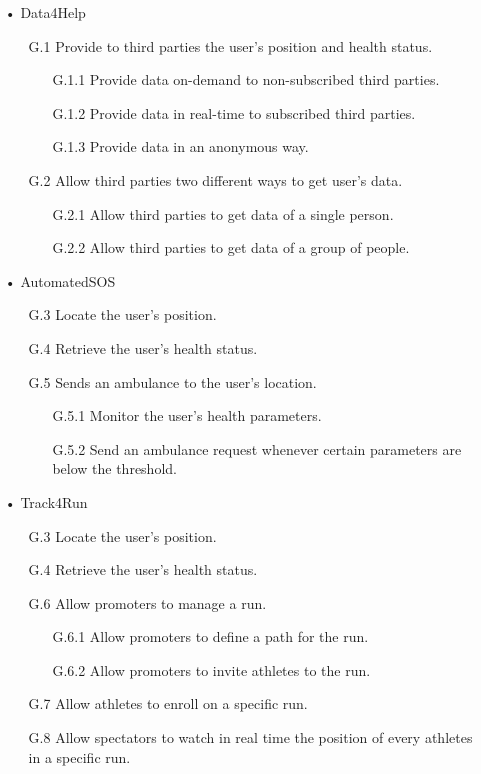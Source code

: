\begin{enumerate}
\item[•] {\Large Data4Help}
	\begin{enumerate}
		\item [G.1] Provide to third parties the user's position and health status.
		\begin{enumerate}
		\item [G.1.1] Provide data on-demand to non-subscribed third parties.
		\item [G.1.2] Provide data in real-time to subscribed third parties.
		\item [G.1.3] Provide data in an anonymous way.
		\end{enumerate}
		\item [G.2] Allow third parties two different ways to get user's data.
		\begin{enumerate}
		\item [G.2.1] Allow third parties to get data of a single person.
		\item [G.2.2] Allow third parties to get data of a group of people.
		\end{enumerate}
	\end{enumerate}
	
\item[•] {\Large AutomatedSOS}
	\begin{enumerate}
		\item [G.3] Locate the user's position.
		\item [G.4] Retrieve the user's health status.
		\item [G.5] Sends an ambulance to the user's location.
		\begin{enumerate}
		\item [G.5.1] Monitor the user's health parameters.
		\item [G.5.2] Send an ambulance request whenever certain parameters are below the threshold.
		\end{enumerate}
	\end{enumerate}
	
\item[•] {\Large Track4Run}	
	\begin{enumerate}
		\item [G.3] Locate the user's position.
		\item [G.4] Retrieve the user's health status.
		\item [G.6] Allow promoters to manage a run.
		\begin{enumerate}
		\item [G.6.1] Allow promoters to define a path for the run. 
		\item [G.6.2] Allow promoters to invite athletes to the run. 
		\end{enumerate}
		\item [G.7] Allow athletes to enroll on a specific run.
		\item [G.8] Allow spectators to watch in real time the position of every athletes in a specific run.
	\end{enumerate}
\end{enumerate}


